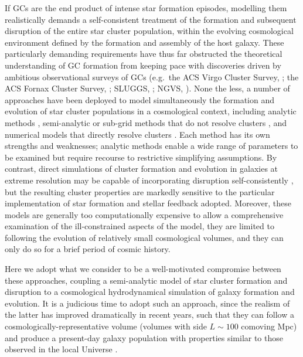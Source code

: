 \documentclass[fleqn,usenatbib]{mnras}
\begin{document}
If GCs are the end product of intense star formation episodes, modelling them realistically demands a self-consistent treatment of the formation and subsequent disruption of the entire star cluster population, within the evolving cosmological environment defined by the formation and assembly of the host galaxy. These particularly demanding requirements have thus far obstructed the theoretical understanding of GC formation from keeping pace with discoveries driven by ambitious observational surveys of GCs (e.g.~the ACS Virgo Cluster Survey, \citealt{Cote_et_al_04}; the ACS Fornax Cluster Survey, \citealt{Jordan_et_al_07_I}; SLUGGS, \citealt{Brodie_et_al_14}; NGVS, \citealt{Ferrarese_et_al_12}). None the less, a number of approaches have been deployed to model simultaneously the formation and evolution of star cluster populations in a cosmological context, including analytic methods \citep[e.g.][]{Kruijssen_15}, semi-analytic or sub-grid methods that do not resolve clusters \citep[e.g.][]{Kravtsov_and_Gnedin_05}, and numerical models that directly resolve clusters \citep[e.g.][]{Ricotti_Parry_and_Gnedin_16}. Each method has its own strengths and weaknesses; analytic methods enable a wide range of parameters to be examined but require recourse to restrictive simplifying assumptions. By contrast, direct simulations of cluster formation and evolution in galaxies at extreme resolution may be capable of incorporating disruption self-consistently \citep[e.g.][]{Li_et_al_17,Kim_et_al_17}, but the resulting cluster properties are markedly sensitive to the particular implementation of star formation and stellar feedback adopted. Moreover, these models are generally too computationally expensive to allow a comprehensive examination of the ill-constrained aspects of the model, they are limited to following the evolution of relatively small cosmological volumes, and they can only do so for a brief period of cosmic history.

Here we adopt what we consider to be a well-motivated compromise between these approaches, coupling a semi-analytic model of star cluster formation and disruption to a cosmological hydrodynamical simulation of galaxy formation and evolution. It is a judicious time to adopt such an approach, since the realism of the latter has improved dramatically in recent years, such that they can follow a cosmologically-representative volume (volumes with side $L\sim100$ comoving Mpc) and produce a present-day galaxy population with properties similar to those observed in the local Universe \citep[e.g.][]{Vogelsberger_et_al_14b, S15,Dave_Thompson_and_Hopkins_16,Kaviraj_et_al_17}.
\end{document}

